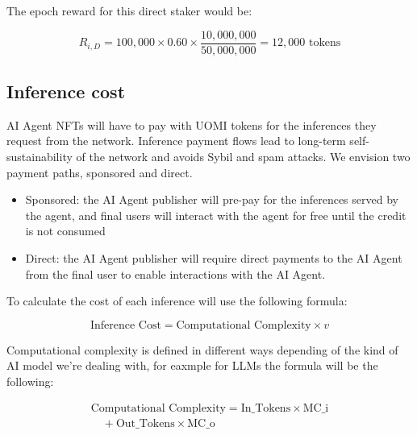 \documentclass{article}
\begin{document}
The epoch reward for this direct staker would be:

\[ R_{i,D} = 100,000 \times 0.60 \times \frac{10,000,000}{50,000,000} = 12,000 \text{ tokens} \]

\subsection{Inference cost}

AI Agent NFTs will have to pay with UOMI tokens for the inferences they request from the network. Inference payment flows lead to long-term self-sustainability of the network and avoids Sybil and spam attacks. We envision two payment paths, sponsored and direct.

\begin{itemize}
\item Sponsored: the AI Agent publisher will pre-pay for the inferences served by the agent, and final users will interact with the agent for free until the credit is not consumed

\item Direct:  the AI Agent publisher will require direct payments to the AI Agent from the final user to enable interactions with the AI Agent.

\end{itemize}

To calculate the cost of each inference will use the following formula:





\[ \text{Inference Cost} = \text{Computational Complexity} \times v \]



Computational complexity is defined in different ways depending of the kind of AI model we’re dealing with, for eaxmple for LLMs the formula will be the following:


\[
\begin{array}{l}
\text{Computational Complexity} = \text{In\_Tokens} \times \text{MC\_i} \\
\quad + \text{Out\_Tokens} \times \text{MC\_o}
\end{array}
\]
\end{document}
